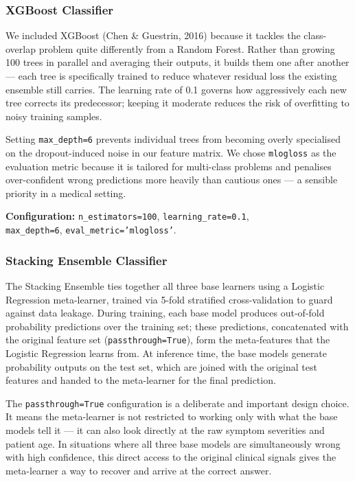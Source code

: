 \documentclass[12pt,a4paper]{article}
\begin{document}
\subsubsection{XGBoost Classifier}
We included XGBoost (Chen \& Guestrin, 2016) because it tackles the class-overlap problem quite differently from a Random Forest. Rather than growing 100 trees in parallel and averaging their outputs, it builds them one after another --- each tree is specifically trained to reduce whatever residual loss the existing ensemble still carries. The learning rate of 0.1 governs how aggressively each new tree corrects its predecessor; keeping it moderate reduces the risk of overfitting to noisy training samples.

Setting \texttt{max\_depth=6} prevents individual trees from becoming overly specialised on the dropout-induced noise in our feature matrix. We chose \texttt{mlogloss} as the evaluation metric because it is tailored for multi-class problems and penalises over-confident wrong predictions more heavily than cautious ones --- a sensible priority in a medical setting.

\textbf{Configuration:} \texttt{n\_estimators=100}, \texttt{learning\_rate=0.1},\\
\hspace*{2.6cm}\texttt{max\_depth=6}, \texttt{eval\_metric='mlogloss'}.

\subsubsection{Stacking Ensemble Classifier}
The Stacking Ensemble ties together all three base learners using a Logistic Regression meta-learner, trained via 5-fold stratified cross-validation to guard against data leakage. During training, each base model produces out-of-fold probability predictions over the training set; these predictions, concatenated with the original feature set (\texttt{passthrough=True}), form the meta-features that the Logistic Regression learns from. At inference time, the base models generate probability outputs on the test set, which are joined with the original test features and handed to the meta-learner for the final prediction.

The \texttt{passthrough=True} configuration is a deliberate and important design choice. It means the meta-learner is not restricted to working only with what the base models tell it --- it can also look directly at the raw symptom severities and patient age. In situations where all three base models are simultaneously wrong with high confidence, this direct access to the original clinical signals gives the meta-learner a way to recover and arrive at the correct answer.
\end{document}
